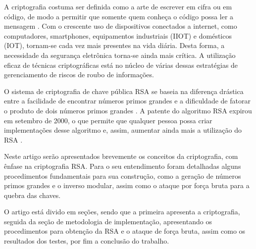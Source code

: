 A criptografia costuma ser definida como a arte de escrever em cifra ou em código, de modo a permitir que somente quem conheça o código possa ler a mensagem \cite{marcacini:10}. Com o crescente uso de dispositivos conectados a internet, como computadores, smartphones, equipamentos industriais (IIOT) e domésticos (IOT), tornam-se cada vez mais presentes na vida diária. Desta forma, a necessidade da segurança eletrônica torna-se ainda mais crítica. A utilização eficaz de técnicas criptográficas está no núcleo de várias dessas estratégias de gerenciamento de riscos de roubo de informações. \cite{burnett:02}


O sistema de criptografia de chave pública RSA se baseia na diferença drástica entre a facilidade de encontrar números primos grandes e a dificuldade de fatorar o produto de dois números primos grandes \cite{cormen:02}. A patente do algoritmo RSA expirou em setembro de 2000, o que permite que qualquer pessoa possa criar implementações desse algoritmo e, assim, aumentar ainda mais a utilização do RSA \cite{burnett:02}.


Neste artigo serão apresentados brevemente os conceitos da criptografia, com ênfase na criptografia RSA. Para o seu entendimento foram detalhadas alguns procedimentos fundamentais para sua construção, como a geração de números primos grandes e o inverso modular, assim como o ataque por força bruta para a quebra das chaves.

O artigo está divido em seções, sendo que a primeira apresenta a criptografia, seguida da seção de metodologia de implementação, apresentando os procedimentos para obtenção da RSA e o ataque de força bruta, assim como os resultados dos testes, por fim a conclusão do trabalho.
